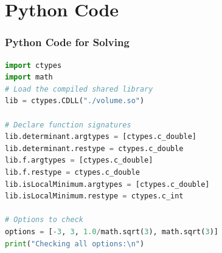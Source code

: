 \documentclass{beamer}
\theoremstyle{remark}
\numberwithin{equation}{section}
\begin{document}
\section{Python Code}
\begin{frame}[fragile]
\frametitle{Python Code for Solving}
\begin{lstlisting}[language=Python]
import ctypes
import math
# Load the compiled shared library
lib = ctypes.CDLL("./volume.so")

# Declare function signatures
lib.determinant.argtypes = [ctypes.c_double]
lib.determinant.restype = ctypes.c_double
lib.f.argtypes = [ctypes.c_double]
lib.f.restype = ctypes.c_double
lib.isLocalMinimum.argtypes = [ctypes.c_double]
lib.isLocalMinimum.restype = ctypes.c_int

# Options to check
options = [-3, 3, 1.0/math.sqrt(3), math.sqrt(3)]
print("Checking all options:\n")
\end{lstlisting}
\end{frame}
\end{document}
